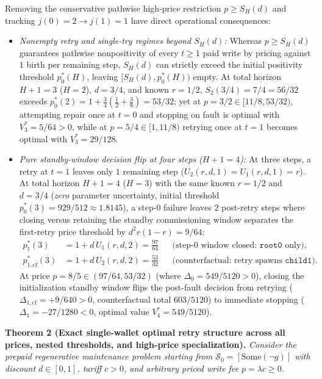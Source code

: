 \documentclass[11pt,letterpaper]{article}
\providecommand{\tightlist}{\setlength{\itemsep}{2pt}\setlength{\parskip}{0pt}}
\begin{document}
Removing the conservative pathwise high-price restriction
\(p \ge S_H(d)\) and tracking \(j(0) = 2 \to j(1) = 1\) have direct
operational consequences:

\begin{itemize}
\tightlist
\item
  \emph{Nonempty retry and single-try regimes beyond \(S_H(d)\):}
  Whereas \(p \ge S_H(d)\) guarantees pathwise nonpositivity of every
  \(t \ge 1\) paid write by pricing against \(1\) birth per remaining
  step, \(S_H(d)\) can strictly exceed the initial positivity threshold
  \(p_0^*(H)\), leaving \([S_H(d), p_0^*(H))\) empty. At total horizon
  \(H + 1 = 3\) (\(H = 2\)), \(d = 3/4\), and known \(r = 1/2\),
  \(S_2(3/4) = 7/4 = 56/32\) exceeds
  \(p_0^*(2) = 1 + \frac{3}{4}(\frac{1}{2} + \frac{3}{8}) = 53/32\); yet
  at \(p = 3/2 \in [11/8, 53/32)\), attempting repair once at \(t = 0\)
  and stopping on fault is optimal with \(V_3^* = 5/64 > 0\), while at
  \(p = 5/4 \in [1, 11/8)\) retrying once at \(t = 1\) becomes optimal
  with \(V_3^* = 29/128\).
\item
  \emph{Pure standby-window decision flip at four steps
  (\(H + 1 = 4\)):} At three steps, a retry at \(t = 1\) leaves only
  \(1\) remaining step (\(U_2(r, d, 1) = U_1(r, d, 1) = r\)). At total
  horizon \(H + 1 = 4\) (\(H = 3\)) with the same known \(r = 1/2\) and
  \(d = 3/4\) (\emph{zero} parameter uncertainty, initial threshold
  \(p_0^*(3) = 929/512 \approx 1.8145\)), a step-\(0\) failure leaves
  \(2\) post-retry steps where closing versus retaining the standby
  commissioning window separates the first-retry price threshold by
  \(d^2 r(1 - r) = 9/64\): \[\begin{aligned}
  p_1^*(3) &= 1 + d\,U_1(r, d, 2) = \frac{97}{64}
  &&\text{(step-$0$ window closed: }\mathtt{root0}\text{ only)}, \\
  p_{1,\mathrm{cf}}^*(3) &= 1 + d\,U_2(r, d, 2) = \frac{53}{32}
  &&\text{(counterfactual: retry spawns }\mathtt{child1}\text{)}.
  \end{aligned}\] At price \(p = 8/5 \in (97/64, 53/32)\) (where
  \(\Delta_0 = 549/5120 > 0\)), closing the initialization standby
  window flips the post-fault decision from retrying
  (\(\Delta_{1,\mathrm{cf}} = +9/640 > 0\), counterfactual total
  \(603/5120\)) to immediate stopping (\(\Delta_1 = -27/1280 < 0\),
  optimal value \(V_4^* = 549/5120\)).
\end{itemize}

\textbf{Theorem 2 (Exact single-wallet optimal retry structure across
all prices, nested thresholds, and high-price specialization).}
\emph{Consider the prepaid regenerative maintenance problem starting
from \(\mathcal{S}_0 = [\mathrm{Some}(\neg g)]\) with discount
\(d \in [0,1]\), tariff \(c > 0\), and arbitrary priced write fee
\(p = \lambda c \ge 0\).}
\end{document}
